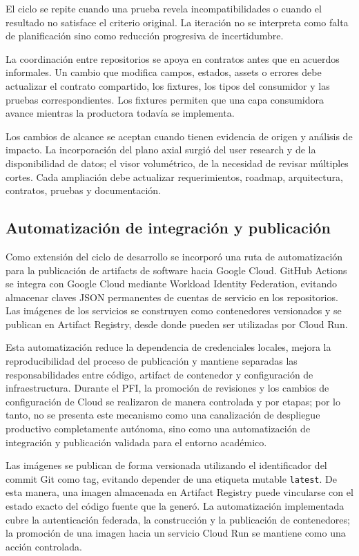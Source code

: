 El ciclo se repite cuando una prueba revela incompatibilidades o cuando el resultado no satisface el criterio original. La iteración no se interpreta como falta de planificación sino como reducción progresiva de incertidumbre.

La coordinación entre repositorios se apoya en contratos antes que en acuerdos informales. Un cambio que modifica campos, estados, assets o errores debe actualizar el contrato compartido, los fixtures, los tipos del consumidor y las pruebas correspondientes. Los fixtures permiten que una capa consumidora avance mientras la productora todavía se implementa.

Los cambios de alcance se aceptan cuando tienen evidencia de origen y análisis de impacto. La incorporación del plano axial surgió del user research y de la disponibilidad de datos; el visor volumétrico, de la necesidad de revisar múltiples cortes. Cada ampliación debe actualizar requerimientos, roadmap, arquitectura, contratos, pruebas y documentación.

\subsection{Automatización de integración y publicación}

Como extensión del ciclo de desarrollo se incorporó una ruta de automatización para la publicación de artifacts de software hacia Google Cloud. GitHub Actions se integra con Google Cloud mediante Workload Identity Federation, evitando almacenar claves JSON permanentes de cuentas de servicio en los repositorios. Las imágenes de los servicios se construyen como contenedores versionados y se publican en Artifact Registry, desde donde pueden ser utilizadas por Cloud Run.

Esta automatización reduce la dependencia de credenciales locales, mejora la reproducibilidad del proceso de publicación y mantiene separadas las responsabilidades entre código, artifact de contenedor y configuración de infraestructura. Durante el PFI, la promoción de revisiones y los cambios de configuración de Cloud se realizaron de manera controlada y por etapas; por lo tanto, no se presenta este mecanismo como una canalización de despliegue productivo completamente autónoma, sino como una automatización de integración y publicación validada para el entorno académico.

Las imágenes se publican de forma versionada utilizando el identificador del commit Git como tag, evitando depender de una etiqueta mutable \texttt{latest}. De esta manera, una imagen almacenada en Artifact Registry puede vincularse con el estado exacto del código fuente que la generó. La automatización implementada cubre la autenticación federada, la construcción y la publicación de contenedores; la promoción de una imagen hacia un servicio Cloud Run se mantiene como una acción controlada.

